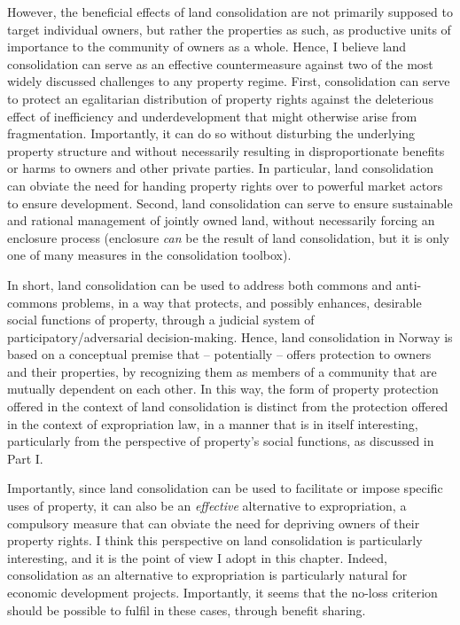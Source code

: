 However, the beneficial effects of land consolidation are not primarily supposed to target individual owners, but rather the properties as such, as productive units  of importance to the community of owners as a whole. Hence, I believe land consolidation can serve as an effective countermeasure against two of the most widely discussed challenges to any property regime. First, consolidation can serve to protect an egalitarian distribution of property rights against the deleterious effect of inefficiency and underdevelopment that might otherwise arise from fragmentation. Importantly, it can do so without disturbing the underlying property structure and without necessarily resulting in disproportionate benefits or harms to owners and other private parties. In particular, land consolidation can obviate the need for handing property rights over to powerful market actors to ensure development. Second, land consolidation can serve to ensure sustainable and rational management of jointly owned land, without necessarily forcing an enclosure process (enclosure {\it can} be the result of land consolidation, but it is only one of many measures in the consolidation toolbox). 

In short, land consolidation can be used to address both commons and anti-commons problems, in a way that protects, and possibly enhances, desirable social functions of property, through a judicial system of participatory/adversarial decision-making. Hence, land consolidation in Norway is based on a conceptual premise that -- potentially -- offers protection to owners and their properties, by recognizing them as members of a community that are mutually dependent on each other. In this way, the form of property protection offered in the context of land consolidation is distinct from the protection offered in the context of expropriation law, in a manner that is in itself interesting, particularly from the perspective of property's social functions, as discussed in Part I.

Importantly, since land consolidation can be used to facilitate or impose specific uses of property, it can also be an {\it effective} alternative to expropriation, a compulsory measure that can obviate the need for depriving owners of their property rights. I think this perspective on land consolidation is particularly interesting, and it is the point of view I adopt in this chapter. Indeed, consolidation as an alternative to expropriation is particularly natural for economic development projects. Importantly, it seems that the no-loss criterion should be possible to fulfil in these cases, through benefit sharing. 

